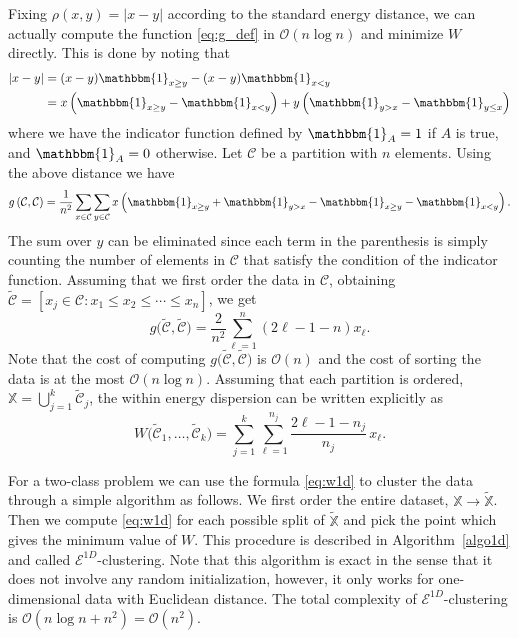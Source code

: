 \documentclass[aps,preprint,nofootinbib,floatfix]{revtex4-1}
\newcommand\C{{\mathcal{C}}}
\newcommand\tC{{\widetilde{\C}}}
\newcommand\OO{{\mathcal{O}}}
\newcommand{\Ind}[1]{\mathbbm{1}_{#1}}
\begin{document}
Fixing
$\rho(x,y) = |x - y|$ according to the standard energy distance, we can 
actually compute the function
\eqref{eq:g_def} in $\OO(n \log n)$ and minimize
$W$ directly.
This is done by noting that
\begin{equation}
\begin{aligned}
|x - y|  &= (x-y)\Ind{x \ge y} -
(x-y) \Ind{x < y}  \\
&= 
x \left( \Ind{x \ge y} - \Ind{x < y} \right)  + 
y \left( \Ind{y > x} - \Ind{y \le x} \right)  
\end{aligned}
\end{equation}
where we have the indicator function defined by 
$\Ind{A}=1$ if $A$ is true, and $\Ind{A}=0$ otherwise. 
Let $\C$ be a partition with
$n$ elements. Using the above distance we have
\begin{equation}
\label{eq:g_ind}
g\left(\C,\C\right) = \dfrac{1}{n^2} \sum_{x \in \C} 
\sum_{y \in \C} 
x \left(
\Ind{x \ge y} + \Ind{y > x} - 
\Ind{x \ge y}-\Ind{x < y} \right) .
\end{equation}
The sum over $y$ can be eliminated since each term in
the parenthesis is simply counting the number of elements in $\C$ that satisfy
the condition of the indicator function. Assuming
that we first order the data in $\C$, obtaining
$\tC = [ x_j \in \C: x_1 \le x_2 \le \dotsm \le x_{n}]$, we
get 
\begin{equation}
\label{eq:g1d}
g\big(\tC, \tC \big) = 
\dfrac{2}{n^2} \sum_{\ell=1}^n (2\ell - 1 - n) x_\ell .
\end{equation}
Note that the cost of computing 
$g\big( \tC, \tC \big)$
is $\OO(n)$ and the cost of
sorting the data
is at the most $\OO(n\log n)$.
Assuming that each partition is ordered,  
$\mathbb{X} = \bigcup_{j=1}^k \tC_j$,
the within energy dispersion
can be written explicitly as
\begin{equation}
\label{eq:w1d}
W\big( \tC_1,\dotsc,\tC_k \big) = 
\sum_{j=1}^k \sum_{\ell=1}^{n_j} \dfrac{2\ell - 1 - n_j}{n_j} \, x_\ell.
\end{equation}

For a two-class problem we can use the formula
\eqref{eq:w1d} to cluster the data
through a simple algorithm 
as follows. We first order
the entire dataset, $\mathbb{X} \to \widetilde{\mathbb{X}}$. Then 
we compute \eqref{eq:w1d} for each possible split of $\widetilde{\mathbb{X}}$
and pick the point which gives the minimum value of $W$.
This procedure is described in Algorithm~\ref{algo1d} and called
$\mathcal{E}^{1D}$-clustering.
Note that this algorithm is exact in the sense that it does not involve
any random initialization,
however,
it only works for one-dimensional data with Euclidean distance. The total
complexity of $\mathcal{E}^{1D}$-clustering is $\OO(n\log n + n^2) = \OO(n^2)$.
\end{document}
